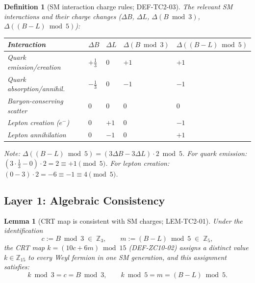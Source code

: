 \documentclass[12pt, a4paper]{article}
\newtheorem{lemma}{Lemma}[section]
\newtheorem{definition}{Definition}[section]
\begin{document}
\begin{definition}[SM interaction charge rules; DEF-TC2-03]
\label{def:sm-interactions}
The relevant SM interactions and their charge changes
($\Delta B$, $\Delta L$, $\Delta(B \bmod 3)$,
$\Delta((B-L)\bmod 5)$):

{\small
\renewcommand{\arraystretch}{1.30}
\begin{tabular}{p{4.0cm} p{1.6cm} p{1.3cm} p{2.4cm} p{2.8cm}}
\toprule
\textbf{Interaction} & $\Delta B$ & $\Delta L$ &
$\Delta(B \bmod 3)$ & $\Delta((B-L)\bmod 5)$ \\
\midrule
Quark emission/creation & $+\tfrac{1}{3}$ & $0$ & $+1$ & $+1$ \\
Quark absorption/annihil. & $-\tfrac{1}{3}$ & $0$ & $-1$ & $-1$ \\
Baryon-conserving scatter & $0$ & $0$ & $0$ & $0$ \\
Lepton creation ($e^-$) & $0$ & $+1$ & $0$ & $-1$ \\
Lepton annihilation & $0$ & $-1$ & $0$ & $+1$ \\
\bottomrule
\end{tabular}
}

\medskip
Note: $\Delta((B-L)\bmod 5) = (3\Delta B - 3\Delta L)\cdot 2 \bmod 5$.
For quark emission: $(3\cdot\frac{1}{3} - 0)\cdot 2 = 2 \equiv +1 \pmod{5}$.
For lepton creation: $(0 - 3)\cdot 2 = -6 \equiv -1 \equiv 4 \pmod{5}$.
\end{definition}

\subsection{Layer 1: Algebraic Consistency}
\label{sec:layer1}

\begin{lemma}[CRT map is consistent with SM charges; LEM-TC2-01]
\label{lem:crt-consistent}
Under the identification
\begin{equation}
  c := B \bmod 3 \;\in\; \mathbb{Z}_3,
  \qquad
  m := (B-L) \bmod 5 \;\in\; \mathbb{Z}_5,
  \label{eq:identification}
\end{equation}
the CRT map $k = (10c + 6m) \bmod 15$ (DEF-ZC10-02) assigns a
distinct value $k \in \mathbb{Z}_{15}$ to every Weyl fermion in one
SM generation, and this assignment satisfies:
\begin{equation}
  k \bmod 3 = c = B \bmod 3,
  \qquad
  k \bmod 5 = m = (B-L) \bmod 5.
  \label{eq:crt-property}
\end{equation}
\end{lemma}
\end{document}
